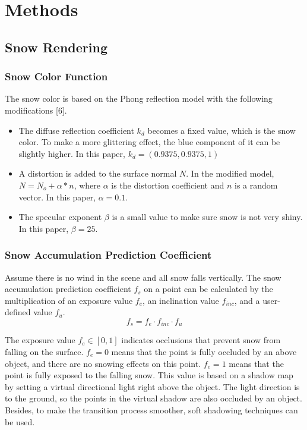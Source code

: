 \documentclass{article}
\begin{document}
\section {Methods}

\subsection {Snow Rendering}

\subsubsection {Snow Color Function}
The snow color is based on the Phong reflection model with the following modifications [6].
\begin{itemize}
  \item The diffuse reflection coefficient \( k_d \) becomes a fixed value, which is the snow color. To make a more glittering effect, the 
  blue component of it can be slightly higher. In this paper, \( k_d = (0.9375, 0.9375, 1)\)
  \item A distortion is added to the surface normal \( N \). In the modified model, \( N = N_{o} + \alpha * n\), where \( \alpha \) is 
  the distortion coefficient and \( n \) is a random vector. In this paper, \( \alpha = 0.1\).
  \item The specular exponent \( \beta \) is a small value to make sure snow is not very shiny. In this paper, \( \beta = 25\).
\end{itemize}

\subsubsection {Snow Accumulation Prediction Coefficient}
Assume there is no wind in the scene and all snow falls vertically. The snow accumulation prediction coefficient \( f_{s} \) on a 
point can be calculated by the multiplication of an exposure value \( f_{e} \), an inclination value \( f_{inc} \), and a user-defined 
value \( f_{u} \).
\[
  f_{s} = f_{e} \cdot f_{inc} \cdot f_{u}
\]

The exposure value \( f_{e} \in [0, 1] \) indicates occlusions that prevent snow from falling on the surface. \( f_{e}=0 \) means that 
the point is fully occluded by an above object, and there are no snowing effects on this point. \( f_{e}=1 \) means that the point is 
fully exposed to the falling snow. This value is based on a shadow map by setting a virtual directional light right above the object. 
The light direction is to the ground, so the points in the virtual shadow are also occluded by an object. Besides, to make the 
transition process smoother, soft shadowing techniques can be used. 
\end{document}
